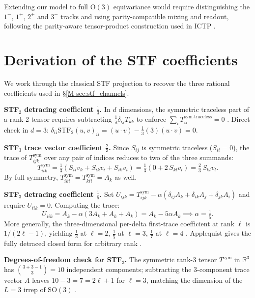 Extending our model to full $\mathrm{O}(3)$ equivariance would require distinguishing the $1^-$, $1^+$, $2^+$ and $3^-$ tracks and using parity-compatible mixing and readout, following the parity-aware tensor-product construction used in ICTP \citep{zaverkin2024ictp}.

\section{Derivation of the STF coefficients}\label{supp:stf_coefficients}

We work through the classical STF projection \citep{coope1965irreducible} to recover the three rational coefficients used in \S\ref{M-sec:stf_channels}.

\textbf{STF$_2$ detracing coefficient $\tfrac{1}{3}$.} In $d$ dimensions, the symmetric traceless part of a rank-2 tensor requires subtracting $\tfrac{1}{d} \delta_{ij} T_{kk}$ to enforce $\sum_i T_{ii}^{\text{sym-traceless}} = 0$ \citep{stone2013theory}. Direct check in $d=3$: $\delta_{ii} \mathrm{STF}_2(u,v)_{ii} = (u\cdot v) - \tfrac{1}{3}(3)(u\cdot v) = 0$.

\textbf{STF$_3$ trace vector coefficient $\tfrac{2}{3}$.} Since $S_{ij}$ is symmetric traceless ($S_{ii}=0$), the trace of $T^{\text{sym}}_{ijk}$ over any pair of indices reduces to two of the three summands:
\[
T^{\text{sym}}_{iik} = \tfrac{1}{3}(S_{ii}v_k + S_{ik}v_i + S_{ik}v_i) = \tfrac{1}{3}(0 + 2\,S_{kl}v_l) = \tfrac{2}{3}\,S_{kl}v_l.
\]
By full symmetry, $T^{\text{sym}}_{iki} = T^{\text{sym}}_{kii} = A_k$ as well.

\textbf{STF$_3$ detracing coefficient $\tfrac{1}{5}$.} Set $U_{ijk} = T^{\text{sym}}_{ijk} - \alpha(\delta_{ij}A_k + \delta_{ik}A_j + \delta_{jk}A_i)$ and require $U_{iik} = 0$. Computing the trace:
\[
U_{iik} = A_k - \alpha(3A_k + A_k + A_k) = A_k - 5\alpha A_k \implies \alpha = \tfrac{1}{5}.
\]
More generally, the three-dimensional per-delta first-trace coefficient at rank $\ell$ is $1/(2\ell - 1)$, yielding $\tfrac{1}{3}$ at $\ell{=}2$, $\tfrac{1}{5}$ at $\ell{=}3$, $\tfrac{1}{7}$ at $\ell{=}4$ \citep{thorne1980multipole}. Applequist gives the fully detraced closed form for arbitrary rank \citep{applequist1989traceless}.

\textbf{Degrees-of-freedom check for STF$_3$.} The symmetric rank-3 tensor $T^{\text{sym}}$ in $\mathbb{R}^3$ has $\binom{3+3-1}{3} = 10$ independent components; subtracting the 3-component trace vector $A$ leaves $10 - 3 = 7 = 2\ell + 1$ for $\ell = 3$, matching the dimension of the $L{=}3$ irrep of $\mathrm{SO}(3)$ \citep{shao2025orthonormal}.

